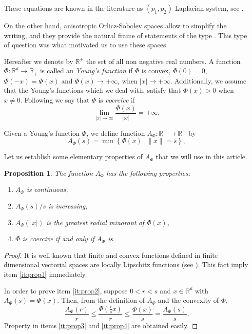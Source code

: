 \documentclass[twoside]{article}
\newtheorem{prop}[thm]{Proposition}
\theoremstyle{remark}
\newcommand{\rr}{\mathbb{R}}
\renewcommand{\leq}{\leqslant}
\begin{document}
These equations are known in the literature as $(p_1,p_2)$-Laplacian system, see
\cite{yang2013existence,pasca2016periodic,yang2012periodic,pasca2010periodic,pacsca2010some,pasca2011some}.


On the other hand, anisotropic Orlicz-Sobolev spaces allow to simplify the writing, and they provide the natural frame of statements of the type \cite[Lemma 3.1]{Tian2007192}. This type of question was what motivated us to use these spaces.

Hereafter we denote  by $\mathbb{R}^+$  the set of all non negative real numbers. A function $\Phi:\mathbb{R}^d\to \mathbb{R}_+ $ is called an \emph{Young's function} if $\Phi$ is convex, $\Phi(0)=0$, $\Phi(-x)=\Phi(x)$ and $\Phi(x)\to +\infty$, when $|x|\to+\infty$. Additionally, we assume that the Young's functions which we deal with, satisfy that $\Phi(x)>0$ when $x\neq 0$. Following \cite{Orliczvectorial2005} we say that $\Phi$ is \emph{coercive} if
\[\lim_{|x|\to\infty}\frac{\Phi(x)}{|x|}=+\infty.\]

Given a Young's function $\Phi$, we define function $A_{\Phi}:\rr^+\to\rr^+$ by
\begin{equation}\label{eq:inversa-gral}
A_{\Phi}(s)=\min\left\{\Phi(x)\,\big|\,\|x\|=s\right\},
\end{equation}

Let us establish some elementary properties of $A_{\Phi}$ that we will use in this article.
\begin{prop}\label{prop:AsubPhi} The function $A_{\Phi}$ has the following properties:
\begin{enumerate}
 \item\label{it:prop1} $A_{\Phi}$ is continuous,
 \item\label{it:prop2} $A_{\Phi}(s)/s$ is increasing,
 \item\label{it:prop3} $A_{\Phi}(|x|)$ is the \emph{greatest radial minorant} of 
 $\Phi(x)$,
 \item\label{it:prop4} $\Phi$ is coercive if and only if $A_{\Phi}$ is.
\end{enumerate}
\end{prop}

\begin{proof} It is well known that finite and convex functions defined in finite dimensional 
vectorial spaces are locally Lipschitz functions (see \cite{clarke2013functional}). This fact 
imply item \ref{it:prop1} immediately. 

In order to prove item \ref{it:prop2}, suppose $0<r<s$ and $x\in\rr^d$ with $A_{\Phi}(s)
=\Phi(x)$. Then, from the definition of $A_{\Phi}$ and the convexity of $\Phi$,
\[\frac{A_{\Phi}(r)}{r}\leq \frac{\Phi\left(\frac{r}{s}x\right)}{r}\leq \frac{\Phi\left(x\right)}{s}=
 \frac{A_{\Phi}(s)}{s}.
\]
Property in items \ref{it:prop3} and \ref{it:prop4} are obtained easily.

 
\end{proof}
\end{document}
